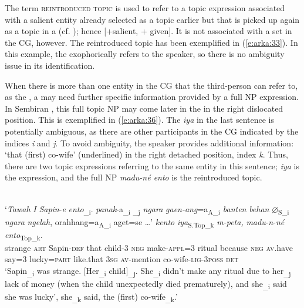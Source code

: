 \documentclass[output=paper
,modfonts
,nonflat]{langsci/langscibook}
\begin{document}
The term \textsc{reintroduced topic} is used to refer to a topic expression associated with a salient entity already selected as a topic earlier but that is picked up again as a topic in a  (cf. \citealt[760]{Givón1990}); hence [+salient, + given]. It is not associated with a  set in the CG, however. The reintroduced topic has been exemplified in (\ref{e:arka:33}). In this example, the  exophorically refers to the speaker, so there is no ambiguity issue in its identification. 

When there is more than one entity in the CG that the third-person  can refer to, as the , a  may need further specific information provided by a full NP expression. In Sembiran , this full topic NP may come later in the  in the right dislocated position. This is exemplified in (\ref{e:arka:36}). The  \textit{iya} in the last sentence is potentially ambiguous, as there are other participants in the CG indicated by the indices \textit{i} and \textit{j}. To avoid ambiguity, the speaker provides additional information: ‘that (first) co-wife’ (underlined) in the right detached position, index \textit{k}. Thus, there are two topic expressions referring to the same entity in this sentence; \textit{iya} is the  expression, and the full NP \textit{madu-né ento} is the reintroduced topic. 

\begin{exe}
	\label{e:arka:36}\\
	\gll ‘\textit{Tawah} {\ob}\textit{I} \textit{Sapin}-\textit{e} \textit{ento}{\cb}\textsubscript{\_i}. {\ob}{\ob}\textit{panak}{\ob}-a{\cb}\textsubscript{\_i} {\cb}\textsubscript{\_j} \textit{ngara} \textit{gaen-ang}{\ob}=a{\cb}\textsubscript{A\_i} \textit{banten} \textit{behan} ${\varnothing}$\textsubscript{S\_i} \textit{ngara} \textit{ngelah}, orahhang{\ob}=a{\cb}\textsubscript{A\_i} aget=se …’ \textit{kento} {\ob}\textit{iya}{\cb}\textsubscript{S.Top\_k} \textit{m-peta,} {\ob}\textit{madu}-\textit{n}-\textit{né} \textit{ento}{\cb}\textsubscript{Top\_k}.\\
	\phantom{‘}strange \phantom{[}\textsc{art} Sapin-\textsc{def} that \phantom{[[}child-3 {} \textsc{neg} 
	make-\textsc{appl}=3 ritual because {} \textsc{neg} \textsc{av}.have
	say=3 lucky=\textsc{part} {} like.that \phantom{[}3\textsc{sg} \textsc{av}-mention \phantom{[}co-wife-\textsc{lig}-3\textsc{poss} \textsc{det}\\
	\glt ‘Sapin\textsubscript{\_i} was strange. [Her\textsubscript{\_i} child]\textsubscript{\_j}. She\textsubscript{\_i} didn’t make any ritual 
	due to her\textsubscript{\_j} lack of money (when the child unexpectedly died prematurely), and she\textsubscript{\_i} said she was lucky’, she\textsubscript{\_k} said, the (first) co-wife\textsubscript{\_k}.’
\end{exe}
\end{document}
